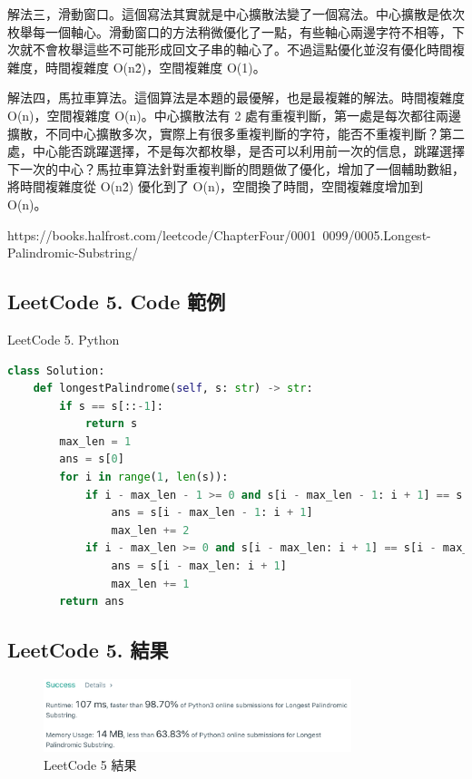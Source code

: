 \documentclass[10pt,UTF8]{ctexart}
\begin{document}
解法三，滑動窗口。這個寫法其實就是中心擴散法變了一個寫法。中心擴散是依次枚舉每一個軸心。滑動窗口的方法稍微優化了一點，有些軸心兩邊字符不相等，下次就不會枚舉這些不可能形成回文子串的軸心了。不過這點優化並沒有優化時間複雜度，時間複雜度 O(n\^2)，空間複雜度 O(1)。

解法四，馬拉車算法。這個算法是本題的最優解，也是最複雜的解法。時間複雜度 O(n)，空間複雜度 O(n)。中心擴散法有 2 處有重複判斷，第一處是每次都往兩邊擴散，不同中心擴散多次，實際上有很多重複判斷的字符，能否不重複判斷？第二處，中心能否跳躍選擇，不是每次都枚舉，是否可以利用前一次的信息，跳躍選擇下一次的中心？馬拉車算法針對重複判斷的問題做了優化，增加了一個輔助數組，將時間複雜度從 O(n\^2) 優化到了 O(n)，空間換了時間，空間複雜度增加到 O(n)。

https://books.halfrost.com/leetcode/ChapterFour/0001~0099/0005.Longest-Palindromic-Substring/

\subsection{LeetCode 5. Code 範例}

LeetCode 5. Python 

\begin{lstlisting}[language={python}]
class Solution:
    def longestPalindrome(self, s: str) -> str:
        if s == s[::-1]:
            return s
        max_len = 1
        ans = s[0]
        for i in range(1, len(s)):
            if i - max_len - 1 >= 0 and s[i - max_len - 1: i + 1] == s[i - max_len - 1: i + 1][::-1]:
                ans = s[i - max_len - 1: i + 1]
                max_len += 2
            if i - max_len >= 0 and s[i - max_len: i + 1] == s[i - max_len: i + 1][::-1]:
                ans = s[i - max_len: i + 1]
                max_len += 1
        return ans
\end{lstlisting}

\subsection{LeetCode 5. 結果}

\begin{figure}[H]
\centering 
\includegraphics[width=0.80\textwidth]{lc-5-o.png} 
\caption{LeetCode 5 結果}
\label{Test}
\end{figure}
\end{document}
